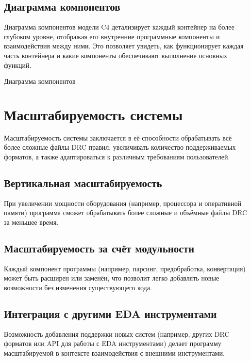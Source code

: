 \subsection{Диаграмма компонентов}

Диаграмма компонентов модели C4 детализирует
каждый контейнер на более глубоком уровне,
отображая его внутренние программные компоненты и взаимодействия между ними.
Это позволяет увидеть, как функционирует каждая часть контейнера
и какие компоненты обеспечивают выполнение основных функций.

\begin{image}
	\caption{Диаграмма компонентов}
	\label{fig:c4:components}
\end{image}

\section{Масштабируемость системы}

Масштабируемость системы заключается в её способности обрабатывать
всё более сложные файлы DRC правил,
увеличивать количество поддерживаемых форматов,
а также адаптироваться к различным требованиям пользователей.

\subsection{Вертикальная масштабируемость}

При увеличении мощности оборудования
(например, процессора и оперативной памяти)
программа сможет обрабатывать более сложные
и объёмные файлы DRC за меньшее время.
  
\subsection{Масштабируемость за счёт модульности}

Каждый компонент программы (например, парсинг, предобработка, конвертация)
может быть расширен или заменён,
что позволит легко добавлять новые возможности
без изменения существующего кода.
  
\subsection{Интеграция с другими EDA инструментами}

Возможность добавления поддержки новых систем
(например, других DRC форматов или API для работы с EDA инструментами)
делает программу масштабируемой
в контексте взаимодействия с внешними инструментами.

